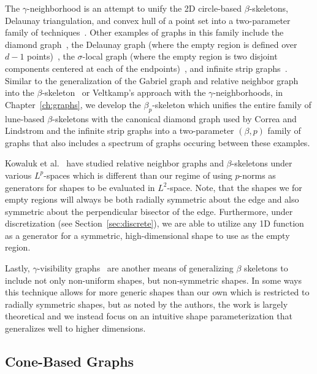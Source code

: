 The $\gamma$-neighborhood is an attempt to unify the 2D circle-based $\beta$-skeletons, Delaunay triangulation, and convex hull of a point set into a two-parameter family of techniques~\cite{Veltkamp1991}.
%
Other examples of graphs in this family include the diamond graph~\cite{CorreaLindstrom2011}, the Delaunay graph (where the empty region is defined over $d-1$ points)~\cite{Delaunay1934}, the $\sigma$-local graph (where the empty region is two disjoint components centered at each of the endpoints)~\cite{BoseColletteLangerman2010}, and infinite strip graphs~\cite{Veltkamp1991,CardinalColletteLangerman2009}.
%
Similar to the generalization of the Gabriel graph and relative neighbor graph into the $\beta$-skeleton~\cite{KirkpatrickRadke1985} or Veltkamp's approach with the $\gamma$-neighborhoods, in Chapter~\ref{ch:graphs}, we develop the $\beta_p$-skeleton which unifies the entire family of lune-based $\beta$-skeletons with the canonical diamond graph used by Correa and Lindstrom and the infinite strip graphs into a two-parameter $(\beta,p)$ family of graphs that also includes a spectrum of graphs occuring between these examples.

Kowaluk et al.~\cite{JaromczykKowaluk1987,KowalukMajewska2014} have studied relative neighbor graphs and $\beta$-skeletons under various $L^p$-spaces which is different than our regime of using $p$-norms as generators for shapes to be evaluated in $L^2$-space.
%
Note, that the shapes we for empty regions will always be both radially symmetric about the edge and also symmetric about the perpendicular bisector of the edge.
%
Furthermore, under discretization (see Section~\ref{sec:discrete}), we are able to utilize any 1D function as a generator for a symmetric, high-dimensional shape to use as the empty region.

Lastly, $\gamma$-visibility graphs~\cite{KatzTalBasri2007,KatzTal2015,KatzTal2017} are another means of generalizing $\beta$ skeletons to include not only non-uniform shapes, but non-symmetric shapes.
%
In some ways this technique allows for more generic shapes than our own which is restricted to radially symmetric shapes, but as noted by the authors, the work is largely theoretical and we instead focus on an intuitive shape parameterization that generalizes well to higher dimensions.

\subsection{Cone-Based Graphs}

